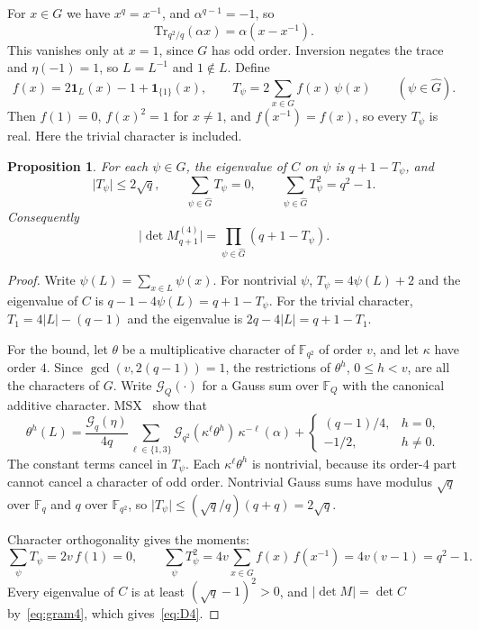 \documentclass[11pt]{article}
\newtheorem{proposition}[theorem]{Proposition}
\newcommand{\F}{\mathbb F}
\newcommand{\one}{\mathbf 1}
\newcommand{\Tr}{\mathrm{Tr}}
\newcommand{\abs}[1]{\lvert#1\rvert}
\begin{document}
For $x\in G$ we have $x^q=x^{-1}$, and $\alpha^{q-1}=-1$, so
\[
 \Tr_{q^2/q}(\alpha x)=\alpha(x-x^{-1}).
\]
This vanishes only at $x=1$, since $G$ has odd order. Inversion negates
the trace and $\eta(-1)=1$, so $L=L^{-1}$ and $1\notin L$. Define
\[
 f(x)=2\one_L(x)-1+\one_{\{1\}}(x),\qquad
 T_\psi=2\sum_{x\in G}f(x)\,\psi(x)\qquad(\psi\in\widehat G).
\]
Then $f(1)=0$, $f(x)^2=1$ for $x\ne1$, and $f(x^{-1})=f(x)$, so every
$T_\psi$ is real. Here the trivial character is included.

\begin{proposition}\label{prop:mom4}
For each $\psi\in\widehat G$, the eigenvalue of $C$ on $\psi$ is
$q+1-T_\psi$, and
\begin{equation}\label{eq:mom4}
 \abs{T_\psi}\le2\sqrt q,\qquad
 \sum_{\psi\in\widehat G}T_\psi=0,\qquad
 \sum_{\psi\in\widehat G}T_\psi^2=q^2-1.
\end{equation}
Consequently
\begin{equation}\label{eq:D4}
 \abs{\det M^{(4)}_{q+1}}=\prod_{\psi\in\widehat G}(q+1-T_\psi).
\end{equation}
\end{proposition}
\begin{proof}
Write $\psi(L)=\sum_{x\in L}\psi(x)$. For nontrivial $\psi$,
$T_\psi=4\psi(L)+2$ and the eigenvalue of $C$ is $q-1-4\psi(L)=q+1-T_\psi$.
For the trivial character, $T_1=4\abs L-(q-1)$ and the eigenvalue is
$2q-4\abs L=q+1-T_1$.

For the bound, let $\theta$ be a multiplicative character of $\F_{q^2}$ of
order $v$, and let $\kappa$ have order $4$. Since $\gcd(v,2(q-1))=1$, the
restrictions of $\theta^h$, $0\le h<v$, are all the characters of $G$.
Write $\mathcal G_Q(\cdot)$ for a Gauss sum over $\F_Q$ with the canonical
additive character. MSX~\cite[Proposition 3.5]{MSX} show that
\[
 \theta^h(L)=\frac{\mathcal G_q(\eta)}{4q}
 \sum_{\ell\in\{1,3\}}\mathcal G_{q^2}(\kappa^\ell\theta^h)\,\kappa^{-\ell}(\alpha)
 +\begin{cases}(q-1)/4,&h=0,\\-1/2,&h\ne0.\end{cases}
\]
The constant terms cancel in $T_\psi$. Each $\kappa^\ell\theta^h$ is
nontrivial, because its order-$4$ part cannot cancel a character of odd
order. Nontrivial Gauss sums have modulus $\sqrt q$ over $\F_q$ and $q$
over $\F_{q^2}$, so $\abs{T_\psi}\le(\sqrt q/q)(q+q)=2\sqrt q$.

Character orthogonality gives the moments:
\[
 \sum_\psi T_\psi=2v\,f(1)=0,\qquad
 \sum_\psi T_\psi^2=4v\sum_{x\in G}f(x)\,f(x^{-1})=4v(v-1)=q^2-1.
\]
Every eigenvalue of $C$ is at least $(\sqrt q-1)^2>0$, and
$\abs{\det M}=\det C$ by~\eqref{eq:gram4}, which gives~\eqref{eq:D4}.
\end{proof}
\end{document}
